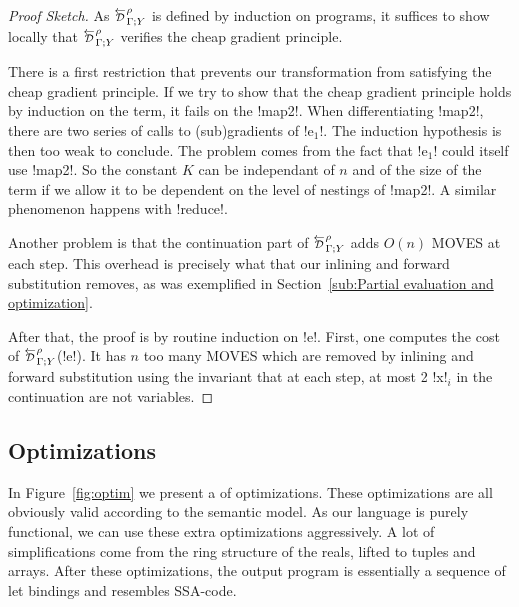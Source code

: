\begin{proof}[Proof Sketch]
    As $\directD{\rho}{\Gamma}{Y}$ is defined by induction on programs, it suffices to show locally 
that $\directD{\rho}{\Gamma}{Y}$ verifies the cheap gradient principle. 

There is a first restriction that prevents our transformation from satisfying the cheap gradient principle.
If we try to show that the cheap gradient principle holds by induction on the term, it fails on the !map2!.
When differentiating !map2!, there are two series of calls to (sub)gradients of !e$_1$!. 
The induction hypothesis is then too weak to conclude. 
The problem comes from the fact that !e$_1$! could itself use !map2!. 
So the constant $K$ can be independant of $n$ and of 
the size of the term if we allow it to be dependent on the level of nestings of !map2!.
A similar phenomenon happens with !reduce!.

Another problem is that the continuation part of $\directD{\rho}{\Gamma}{Y}$ adds $O(n)$ MOVES at each step.
This overhead is precisely what that our inlining and forward substitution removes, 
as was exemplified in Section~\ref{sub:Partial evaluation and optimization}. 

After that, the proof is by routine induction on !e!. 
First, one computes the cost of $\directD{\rho}{\Gamma}{Y}$(!e!).
It has $n$ too many MOVES which are removed by inlining and forward substitution using the invariant that at each step, 
at most 2 !x!$_i$ in the continuation are not variables.
\end{proof}



\subsection{Optimizations} %
\label{sub:Optimizations}

In Figure~\ref{fig:optim} we present a of optimizations. 
These optimizations are all obviously valid according to the semantic model. 
As our language is purely functional, we can use these extra optimizations aggressively. 
A lot of simplifications come from the ring structure of the reals, lifted to tuples and arrays.
After these optimizations, the output program is essentially a sequence of let bindings 
and resembles SSA-code.

